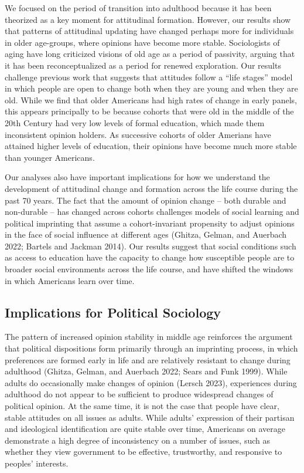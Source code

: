 \documentclass[
  12pt,
]{article}
\begin{document}
We focused on the period of transition into adulthood because it has been theorized as a key moment for attitudinal formation. However, our results show that patterns of attitudinal updating have changed perhaps more for individuals in older age-groups, where opinions have become more stable. Sociologists of aging have long criticized visions of old age as a period of passivity, arguing that it has been reconceptualized as a period for renewed exploration. Our results challenge previous work that suggests that attitudes follow a ``life stages'' model in which people are open to change both when they are young and when they are old. While we find that older Americans had high rates of change in early panels, this appears principally to be because cohorts that were old in the middle of the 20th Century had very low levels of formal education, which made them inconsistent opinion holders. As successive cohorts of older Amerians have attained higher levels of education, their opinions have become much more stable than younger Americans.

Our analyses also have important implications for how we understand the development of attitudinal change and formation across the life course during the past 70 years. The fact that the amount of opinion change -- both durable and non-durable -- has changed across cohorts challenges models of social learning and political imprinting that assume a cohort-invariant propensity to adjust opinions in the face of social influence at different ages (Ghitza, Gelman, and Auerbach 2022; Bartels and Jackman 2014). Our results suggest that social conditions such as access to education have the capacity to change how susceptible people are to broader social environments across the life course, and have shifted the windows in which Americans learn over time.

\hypertarget{implications-for-political-sociology}{%
\subsection{Implications for Political Sociology}\label{implications-for-political-sociology}}

The pattern of increased opinion stability in middle age reinforces the argument that political dispositions form primarily through an imprinting process, in which preferences are formed early in life and are relatively resistant to change during adulthood (Ghitza, Gelman, and Auerbach 2022; Sears and Funk 1999). While adults do occasionally make changes of opinion (Lersch 2023), experiences during adulthood do not appear to be sufficient to produce widespread changes of political opinion. At the same time, it is not the case that people have clear, stable attitudes on all issues as adults. While adults' expression of their partisan and ideological identification are quite stable over time, Americans on average demonstrate a high degree of inconsistency on a number of issues, such as whether they view government to be effective, trustworthy, and responsive to peoples' interests.
\end{document}
